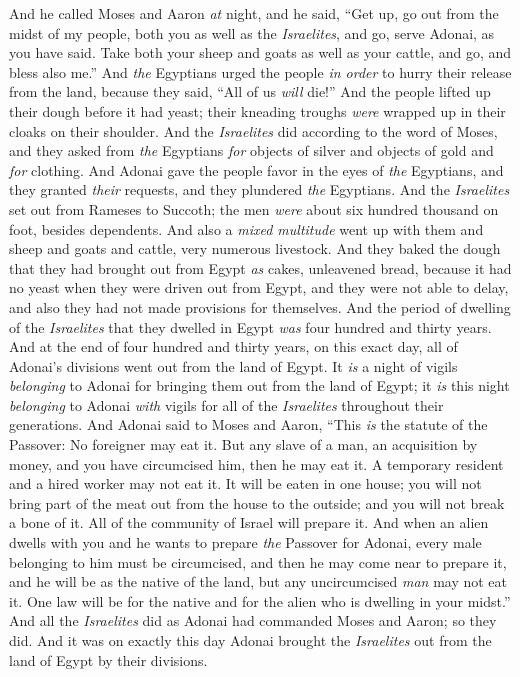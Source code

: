 \begin{biblechapter}
\verse And he called Moses and Aaron \textit{at} night, and he said, “Get up, go out from the midst of my people, both you as well as the \textit{Israelites}, and go, serve Adonai, as you have said.
\verse Take both your sheep and goats as well as your cattle, and go, and bless also me.”
\verse And \textit{the} Egyptians urged the people \textit{in order} to hurry their release from the land, because they said, “All of us \textit{will} die!”
\verse And the people lifted up their dough before it had yeast; their kneading troughs \textit{were} wrapped up in their cloaks on their shoulder.
\verse And the \textit{Israelites} did according to the word of Moses, and they asked from \textit{the} Egyptians \textit{for} objects of silver and objects of gold and \textit{for} clothing.
\verse And Adonai gave the people favor in the eyes of \textit{the} Egyptians, and they granted \textit{their} requests, and they plundered \textit{the} Egyptians.
\verse And the \textit{Israelites} set out from Rameses to Succoth; the men \textit{were} about six hundred thousand on foot, besides dependents.
\verse And also a \textit{mixed multitude} went up with them and sheep and goats and cattle, very numerous livestock.
\verse And they baked the dough that they had brought out from Egypt \textit{as} cakes, unleavened bread, because it had no yeast when they were driven out from Egypt, and they were not able to delay, and also they had not made provisions for themselves.
\verse And the period of dwelling of the \textit{Israelites} that they dwelled in Egypt \textit{was} four hundred and thirty years.
\verse And at the end of four hundred and thirty years, on this exact day, all of Adonai’s divisions went out from the land of Egypt.
\verse It \textit{is} a night of vigils \textit{belonging} to Adonai for bringing them out from the land of Egypt; it \textit{is} this night \textit{belonging} to Adonai \textit{with} vigils for all of the \textit{Israelites} throughout their generations.
\verse And Adonai said to Moses and Aaron, “This \textit{is} the statute of the Passover: No foreigner may eat it.
\verse But any slave of a man, an acquisition by money, and you have circumcised him, then he may eat it.
\verse A temporary resident and a hired worker may not eat it.
\verse It will be eaten in one house; you will not bring part of the meat out from the house to the outside; and you will not break a bone of it.
\verse All of the community of Israel will prepare it.
\verse And when an alien dwells with you and he wants to prepare \textit{the} Passover for Adonai, every male belonging to him must be circumcised, and then he may come near to prepare it, and he will be as the native of the land, but any uncircumcised \textit{man} may not eat it.
\verse One law will be for the native and for the alien who is dwelling in your midst.”
\verse And all the \textit{Israelites} did as Adonai had commanded Moses and Aaron; so they did.
\verse And it was on exactly this day Adonai brought the \textit{Israelites} out from the land of Egypt by their divisions.
\end{biblechapter}

